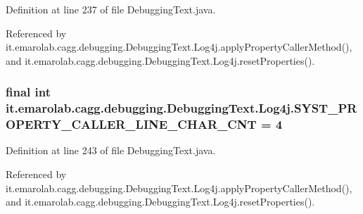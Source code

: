 Definition at line 237 of file Debugging\-Text.\-java.



Referenced by it.\-emarolab.\-cagg.\-debugging.\-Debugging\-Text.\-Log4j.\-apply\-Property\-Caller\-Method(), and it.\-emarolab.\-cagg.\-debugging.\-Debugging\-Text.\-Log4j.\-reset\-Properties().

\hypertarget{classit_1_1emarolab_1_1cagg_1_1debugging_1_1DebuggingText_1_1Log4j_a64e6a91eb91ad47aea6c35347c1d6da3}{
\subsubsection[{S\-Y\-S\-T\-\_\-\-P\-R\-O\-P\-E\-R\-T\-Y\-\_\-\-C\-A\-L\-L\-E\-R\-\_\-\-L\-I\-N\-E\-\_\-\-C\-H\-A\-R\-\_\-\-C\-N\-T}]{\setlength{\rightskip}{0pt plus 5cm}final int it.\-emarolab.\-cagg.\-debugging.\-Debugging\-Text.\-Log4j.\-S\-Y\-S\-T\-\_\-\-P\-R\-O\-P\-E\-R\-T\-Y\-\_\-\-C\-A\-L\-L\-E\-R\-\_\-\-L\-I\-N\-E\-\_\-\-C\-H\-A\-R\-\_\-\-C\-N\-T = 4\hspace{0.3cm}{\ttfamily [static]}}}\label{classit_1_1emarolab_1_1cagg_1_1debugging_1_1DebuggingText_1_1Log4j_a64e6a91eb91ad47aea6c35347c1d6da3}


Definition at line 243 of file Debugging\-Text.\-java.



Referenced by it.\-emarolab.\-cagg.\-debugging.\-Debugging\-Text.\-Log4j.\-apply\-Property\-Caller\-Method(), and it.\-emarolab.\-cagg.\-debugging.\-Debugging\-Text.\-Log4j.\-reset\-Properties().

